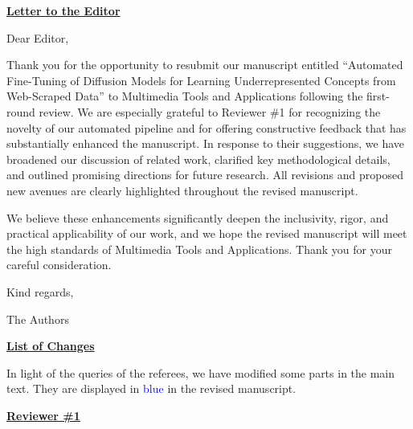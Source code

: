 \documentclass[11pt]{article}
\begin{document}
\begin{center}
{\bf \underline{Letter to the Editor}}
\end{center}
\vspace{1cm}

\noindent Dear Editor,
\vspace{0.5cm}

Thank you for the opportunity to resubmit our manuscript entitled ``Automated Fine-Tuning of Diffusion Models for Learning Underrepresented Concepts from Web-Scraped Data” to Multimedia Tools and Applications following the first-round review. We are especially grateful to Reviewer \#1 for recognizing the novelty of our automated pipeline and for offering constructive feedback that has substantially enhanced the manuscript. In response to their suggestions, we have broadened our discussion of related work, clarified key methodological details, and outlined promising directions for future research. All revisions and proposed new avenues are clearly highlighted throughout the revised manuscript.


\vspace{0.5cm}

\noindent We believe these enhancements significantly deepen the inclusivity, rigor, and practical applicability of our work, and we hope the revised manuscript will meet the high standards of Multimedia Tools and Applications. Thank you for your careful consideration.

\vspace{0.5cm}

\noindent Kind regards,

\vspace{0.5cm}

\noindent The Authors
\vspace{2cm}

\newpage
\begin{center}
{\bf \underline{List of Changes}}
\end{center}
\smallskip

\noindent In light of the queries of the referees, we have modified some parts in the main text. They are displayed in \textcolor{blue}{blue} in the revised manuscript. 



\begin{center}
{\bf \underline{Reviewer \#1}}
\end{center}
\end{document}
